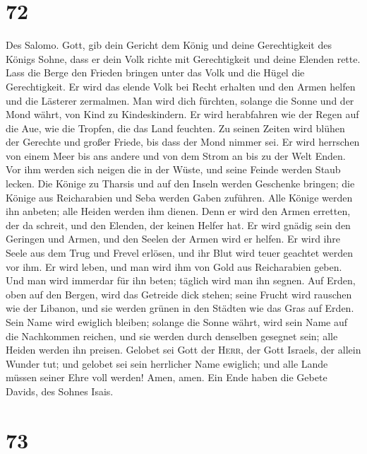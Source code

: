\hypertarget{section-71}{%
\section{72}\label{section-71}}

 Des Salomo. Gott, gib dein Gericht dem König und deine
Gerechtigkeit des Königs Sohne,  dass er dein Volk richte
mit Gerechtigkeit und deine Elenden rette.  Lass die Berge
den Frieden bringen unter das Volk und die Hügel die Gerechtigkeit.
 Er wird das elende Volk bei Recht erhalten und den Armen
helfen und die Lästerer zermalmen.  Man wird dich
fürchten, solange die Sonne und der Mond währt, von Kind zu
Kindeskindern.  Er wird herabfahren wie der Regen auf die
Aue, wie die Tropfen, die das Land feuchten.  Zu seinen
Zeiten wird blühen der Gerechte und großer Friede, bis dass der Mond
nimmer sei.  Er wird herrschen von einem Meer bis ans
andere und von dem Strom an bis zu der Welt Enden.  Vor
ihm werden sich neigen die in der Wüste, und seine Feinde werden Staub
lecken.  Die Könige zu Tharsis und auf den Inseln werden
Geschenke bringen; die Könige aus Reicharabien und Seba werden Gaben
zuführen.  Alle Könige werden ihn anbeten; alle Heiden
werden ihm dienen.  Denn er wird den Armen erretten, der
da schreit, und den Elenden, der keinen Helfer hat.  Er
wird gnädig sein den Geringen und Armen, und den Seelen der Armen wird
er helfen.  Er wird ihre Seele aus dem Trug und Frevel
erlösen, und ihr Blut wird teuer geachtet werden vor ihm.
 Er wird leben, und man wird ihm von Gold aus
Reicharabien geben. Und man wird immerdar für ihn beten; täglich wird
man ihn segnen.  Auf Erden, oben auf den Bergen, wird das
Getreide dick stehen; seine Frucht wird rauschen wie der Libanon, und
sie werden grünen in den Städten wie das Gras auf Erden. 
Sein Name wird ewiglich bleiben; solange die Sonne währt, wird sein Name
auf die Nachkommen reichen, und sie werden durch denselben gesegnet
sein; alle Heiden werden ihn preisen.  Gelobet sei Gott
der \textsc{Herr}, der Gott Israels, der allein Wunder tut;
 und gelobet sei sein herrlicher Name ewiglich; und alle
Lande müssen seiner Ehre voll werden! Amen, amen.  Ein
Ende haben die Gebete Davids, des Sohnes Isais.

\hypertarget{section-72}{%
\section{73}\label{section-72}}

